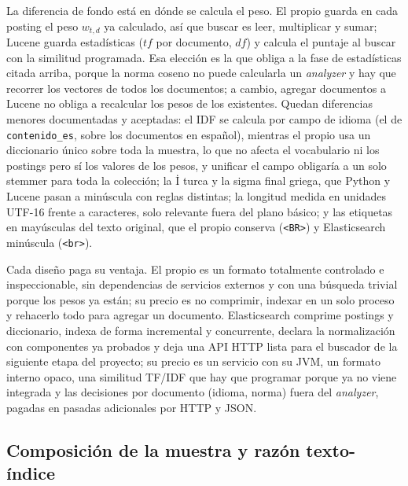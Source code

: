\documentclass[11pt,spanish]{article}
\begin{document}
La diferencia de fondo está en dónde se calcula el peso. El propio guarda en cada posting el peso $w_{t,d}$ ya calculado, así que buscar es leer, multiplicar y sumar; Lucene guarda estadísticas ($tf$ por documento, $df$) y calcula el puntaje al buscar con la similitud programada. Esa elección es la que obliga a la fase de estadísticas citada arriba, porque la norma coseno no puede calcularla un \emph{analyzer} y hay que recorrer los vectores de todos los documentos; a cambio, agregar documentos a Lucene no obliga a recalcular los pesos de los existentes. Quedan diferencias menores documentadas y aceptadas: el IDF se calcula por campo de idioma (el de \texttt{contenido\_es}, sobre los documentos en español), mientras el propio usa un diccionario único sobre toda la muestra, lo que no afecta el vocabulario ni los postings pero sí los valores de los pesos, y unificar el campo obligaría a un solo stemmer para toda la colección; la İ turca y la sigma final griega, que Python y Lucene pasan a minúscula con reglas distintas; la longitud medida en unidades UTF-16 frente a caracteres, solo relevante fuera del plano básico; y las etiquetas en mayúsculas del texto original, que el propio conserva (\texttt{<BR>}) y Elasticsearch minúscula (\texttt{<br>}).

Cada diseño paga su ventaja. El propio es un formato totalmente controlado e inspeccionable, sin dependencias de servicios externos y con una búsqueda trivial porque los pesos ya están; su precio es no comprimir, indexar en un solo proceso y rehacerlo todo para agregar un documento. Elasticsearch comprime postings y diccionario, indexa de forma incremental y concurrente, declara la normalización con componentes ya probados y deja una API HTTP lista para el buscador de la siguiente etapa del proyecto; su precio es un servicio con su JVM, un formato interno opaco, una similitud TF/IDF que hay que programar porque ya no viene integrada y las decisiones por documento (idioma, norma) fuera del \emph{analyzer}, pagadas en pasadas adicionales por HTTP y JSON.

\subsection{Composición de la muestra y razón texto-índice}
\end{document}
